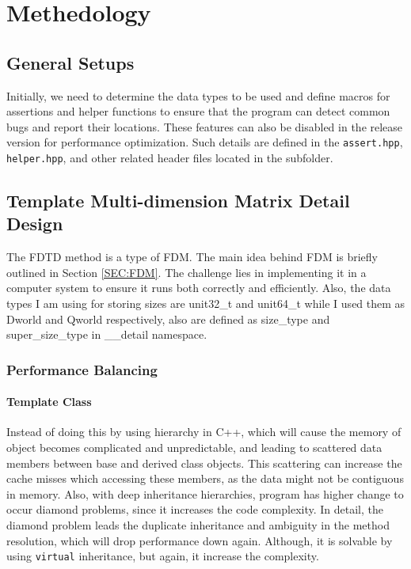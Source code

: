 \section{Methedology}
\subsection{General Setups}
Initially, we need to determine the data types to be used and define macros for 
assertions and helper functions to ensure that the program can detect common bugs 
and report their locations. 
These features can also be disabled in the release version for performance optimization. 
Such details are defined in the \texttt{assert.hpp}, \texttt{helper.hpp}, 
and other related header files located in the subfolder.

\subsection{Template Multi-dimension Matrix Detail Design}
The FDTD method is a type of FDM. 
The main idea behind FDM is briefly outlined in Section \ref{SEC:FDM}. 
The challenge lies in implementing it in a computer system to ensure it runs both correctly and efficiently.
Also, the data types I am using for storing sizes are unit32\_t and unit64\_t while I used them 
as Dworld and Qworld respectively, also are defined as size\_type and super\_size\_type in \_\_detail namespace.

\subsubsection{Performance Balancing}
\paragraph{Template Class}
Instead of doing this by using hierarchy in C++, which will cause the memory of object becomes complicated and unpredictable,
and leading to scattered data members between base and derived class objects.
This scattering can increase the cache misses which accessing these members, as the data might not be contiguous in memory.
Also, with deep inheritance hierarchies, program has higher change to occur diamond problems, since it increases the code complexity.
In detail, the diamond problem leads the duplicate inheritance and ambiguity in the method resolution, which will drop performance down again.
Although, it is solvable by using \texttt{virtual} inheritance, but again, it increase the complexity.

